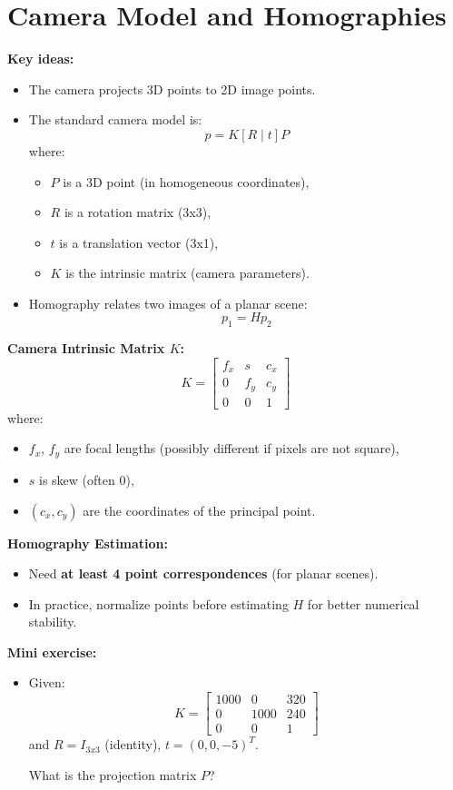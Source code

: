 \documentclass[a4paper,11pt]{article}
\begin{document}
\newpage

\section{Camera Model and Homographies}

\textbf{Key ideas:}
\begin{itemize}
    \item The camera projects 3D points to 2D image points.
    \item The standard camera model is:
    \[
    p = K [R \mid t] P
    \]
    where:
    \begin{itemize}
        \item $P$ is a 3D point (in homogeneous coordinates),
        \item $R$ is a rotation matrix (3x3),
        \item $t$ is a translation vector (3x1),
        \item $K$ is the intrinsic matrix (camera parameters).
    \end{itemize}
    \item Homography relates two images of a planar scene:
    \[
    p_1 = H p_2
    \]
\end{itemize}

\textbf{Camera Intrinsic Matrix $K$:}
\[
K = \begin{bmatrix}
f_x & s & c_x \\
0 & f_y & c_y \\
0 & 0 & 1
\end{bmatrix}
\]
where:
\begin{itemize}
    \item $f_x$, $f_y$ are focal lengths (possibly different if pixels are not square),
    \item $s$ is skew (often 0),
    \item $(c_x, c_y)$ are the coordinates of the principal point.
\end{itemize}

\textbf{Homography Estimation:}
\begin{itemize}
    \item Need \textbf{at least 4 point correspondences} (for planar scenes).
    \item In practice, normalize points before estimating $H$ for better numerical stability.
\end{itemize}

\textbf{Mini exercise:}
\begin{itemize}
    \item Given:
    \[
    K = \begin{bmatrix} 1000 & 0 & 320 \\ 0 & 1000 & 240 \\ 0 & 0 & 1 \end{bmatrix}
    \]
    and $R = I_{3x3}$ (identity), $t = (0, 0, -5)^T$.
    
    What is the projection matrix $P$?
\end{itemize}
\end{document}

